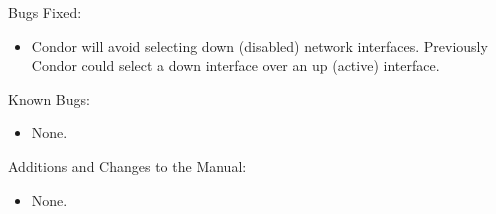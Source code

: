 \noindent Bugs Fixed:

\begin{itemize}

\item Condor will avoid selecting down (disabled) network interfaces.  Previously Condor could select a down interface over an up (active) interface.

\end{itemize}

\noindent Known Bugs:

\begin{itemize}

\item None.

\end{itemize}

\noindent Additions and Changes to the Manual:

\begin{itemize}

\item None.

\end{itemize}


